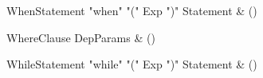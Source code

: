 \begin{bbgrammar}

WhenStatement \label{prod:WhenStatement}  \: \xcd"when" \xcd"(" Exp \xcd")" Statement & () \\


\end{bbgrammar}

\begin{bbgrammar}

WhereClause \label{prod:WhereClause}  \: DepParams & () \\


\end{bbgrammar}

\begin{bbgrammar}

WhileStatement \label{prod:WhileStatement}  \: \xcd"while" \xcd"(" Exp \xcd")" Statement & () \\


\end{bbgrammar}
